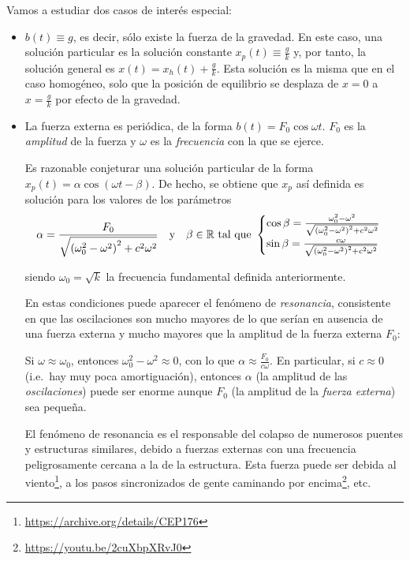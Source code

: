 \documentclass[../ecuaciones_diferenciales.tex]{subfiles}
\begin{document}
Vamos a estudiar dos casos de interés especial:

\begin{itemize}
	\item \(b(t) \equiv g\), es decir, sólo existe la fuerza de la gravedad. En
	      este caso, una solución particular es la solución constante \(x_p(t) \equiv
	      \frac{g}{k}\) y, por tanto, la solución general es \(x(t) = x_h(t) +
	      \frac{g}{k}\). Esta solución es la misma que en el caso homogéneo, solo que
	      la posición de equilibrio se desplaza de \(x=0\) a \(x=\frac{g}{k}\) por
	      efecto de la gravedad.
	\item La fuerza externa es periódica, de la forma
	      \(b(t) = F_0 \cos \omega t\). \(F_0\) es la \emph{amplitud} de la fuerza y
	      \(\omega\) es la \emph{frecuencia} con la que se ejerce.

	      Es razonable conjeturar una solución particular de la forma \(x_p(t) =
	      \alpha \cos (\omega t - \beta)\). De hecho, se obtiene que \(x_p\) así
	      definida es solución para los valores de los parámetros
	      \[\alpha = \frac{F_0}{\sqrt{{(\omega_0^2-\omega^2)}^2+c^2 \omega^2}} \quad
		      \text{y} \quad \beta \in \mathbb{R} \text{ tal que }
		      \begin{cases}
			      \cos \beta =
			      \frac{\omega_0^2-\omega^2}{\sqrt{{(\omega_0^2-\omega^2)}^2+c^2\omega^2}} \\
			      \sin \beta = \frac{c\omega}{\sqrt{{(\omega_0^2-\omega^2)}^2+c^2\omega^2}}
		      \end{cases}
	      \]

	      siendo \(\omega_0 = \sqrt{k}\) la frecuencia fundamental definida
	      anteriormente.

	      En estas condiciones puede aparecer el fenómeno de \emph{resonancia},
	      consistente en que las oscilaciones son mucho mayores de lo que serían en
	      ausencia de una fuerza externa y mucho mayores que la amplitud de la fuerza
	      externa \(F_0\):

	      Si \(\omega \approx \omega_0\), entonces \(\omega_0^2-\omega^2 \approx 0\),
	      con lo que \(\alpha \approx \frac{F_0}{c\omega}\). En particular, si
	      \(c \approx 0\) (i.e.\ hay muy poca amortiguación), entonces \(\alpha\) (la
	      amplitud de las \emph{oscilaciones}) puede ser enorme aunque \(F_0\) (la
	      amplitud de la \emph{fuerza externa}) sea pequeña.

	      El fenómeno de resonancia es el responsable del colapso de numerosos puentes
	      y estructuras similares, debido a fuerzas externas con una frecuencia
	      peligrosamente cercana a la de la estructura. Esta fuerza puede ser debida
	      al viento\footnote{\url{https://archive.org/details/CEP176}}, a los pasos
	      sincronizados de gente caminando por
	      encima\footnote{\url{https://youtu.be/2cuXbpXRvJ0}}, etc.
\end{itemize}
\end{document}
